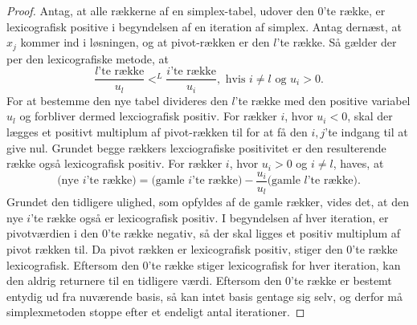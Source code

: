 \begin{proof}
Antag, at alle rækkerne af en simplex-tabel, udover den $0$'te række, er lexicografisk positive i begyndelsen af en iteration af simplex. 
Antag dernæst, at $x_j$ kommer ind i løsningen, og at pivot-rækken er den $l$'te række. Så gælder der per den lexicografiske metode, at
$$\dfrac{l\text{'te række}}{u_l}<^L \dfrac{i\text{'te række}}{u_i}, \text{  hvis } i\neq l \text{ og }u_i>0.$$
For at bestemme den nye tabel divideres den $l$'te række med den positive variabel $u_l$ og forbliver dermed lexciografisk positiv.
For rækker $i$, hvor $u_i<0$, skal der lægges et positivt multiplum af pivot-rækken til for at få den $i,j$'te indgang til at give nul. 
Grundet begge rækkers lexciografiske positivitet er den resulterende række også lexicografisk positiv.
For rækker $i$, hvor $u_i>0$ og $i\neq l$, haves, at
$$\text{(nye }i\text{'te række)}=\text{(gamle }i\text{'te række)}-\dfrac{u_i}{u_l}\text{(gamle }l\text{'te række)}.$$
Grundet den tidligere ulighed, som opfyldes af de gamle rækker, vides det, at den nye $i$'te række også er lexicografisk positiv.
%
I begyndelsen af hver iteration, er pivotværdien i den $0$'te række negativ, så der skal ligges et positiv multiplum af pivot rækken til. 
Da pivot rækken er lexicografisk positiv, stiger den $0$'te række lexicografisk.
%
Eftersom den $0$'te række stiger lexicografisk for hver iteration, kan den aldrig returnere til en tidligere værdi.
Eftersom den $0$'te række er bestemt entydig ud fra nuværende basis, så kan intet basis gentage sig selv, og derfor må simplexmetoden stoppe efter et endeligt antal iterationer.
\end{proof}
%
%
%
%